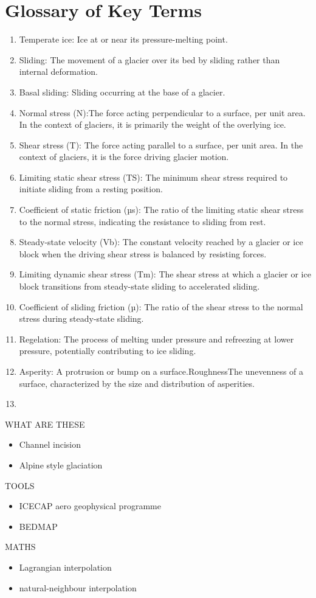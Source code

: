 \chapter{Glossary of Key Terms}\label{glossary}
\begin{enumerate}
\item Temperate ice: Ice at or near its pressure-melting point.
\item Sliding: The movement of a glacier over its bed by sliding rather than internal deformation.
\item Basal sliding: Sliding occurring at the base of a glacier.
\item Normal stress (N):The force acting perpendicular to a surface, per unit area. In the context of glaciers, it is primarily the weight of the overlying ice.
\item Shear stress (T): The force acting parallel to a surface, per unit area. In the context of glaciers, it is the force driving glacier motion.
\item Limiting static shear stress (TS): The minimum shear stress required to initiate sliding from a resting position.
\item Coefficient of static friction (µs): The ratio of the limiting static shear stress to the normal stress, indicating the resistance to sliding from rest.
\item Steady-state velocity (Vb): The constant velocity reached by a glacier or ice block when the driving shear stress is balanced by resisting forces.
\item Limiting dynamic shear stress (Tm): The shear stress at which a glacier or ice block transitions from steady-state sliding to accelerated sliding.
\item Coefficient of sliding friction (µ): The ratio of the shear stress to the normal stress during steady-state sliding.
\item Regelation: The process of melting under pressure and refreezing at lower pressure, potentially contributing to ice sliding.
\item Asperity: A protrusion or bump on a surface.RoughnessThe unevenness of a surface, characterized by the size and distribution of asperities.
\item
\end{enumerate}

    WHAT ARE THESE
    \begin{itemize}
    \item{Channel incision}
    \item{Alpine style glaciation}
    \end{itemize}
    \vspace{1cm}
    TOOLS
    {\small \begin{itemize}
    \item{ICECAP aero geophysical programme}
    \item{BEDMAP}
    \end{itemize}
    }
    \vspace{1cm}
    MATHS
    {\small \begin{itemize}
    \item{Lagrangian interpolation}
    \item{natural-neighbour interpolation}
    \end{itemize}
    }